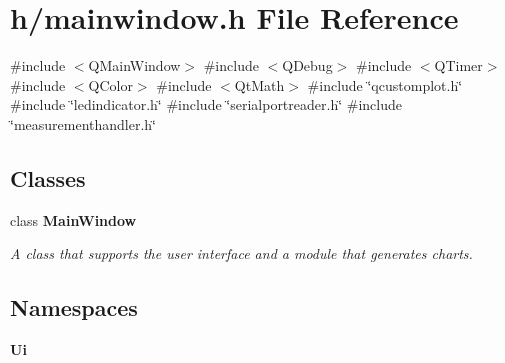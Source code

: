 \section{h/mainwindow.h File Reference}
\label{mainwindow_8h}
{\ttfamily \#include $<$Q\+Main\+Window$>$}\newline
{\ttfamily \#include $<$Q\+Debug$>$}\newline
{\ttfamily \#include $<$Q\+Timer$>$}\newline
{\ttfamily \#include $<$Q\+Color$>$}\newline
{\ttfamily \#include $<$Qt\+Math$>$}\newline
{\ttfamily \#include \char`\"{}qcustomplot.\+h\char`\"{}}\newline
{\ttfamily \#include \char`\"{}ledindicator.\+h\char`\"{}}\newline
{\ttfamily \#include \char`\"{}serialportreader.\+h\char`\"{}}\newline
{\ttfamily \#include \char`\"{}measurementhandler.\+h\char`\"{}}\newline
\subsection*{Classes}
\begin{DoxyCompactItemize}
\item 
class \textbf{ Main\+Window}
\begin{DoxyCompactList}\small\item\em A class that supports the user interface and a module that generates charts. \end{DoxyCompactList}\end{DoxyCompactItemize}
\subsection*{Namespaces}
\begin{DoxyCompactItemize}
\item 
 \textbf{ Ui}
\end{DoxyCompactItemize}
